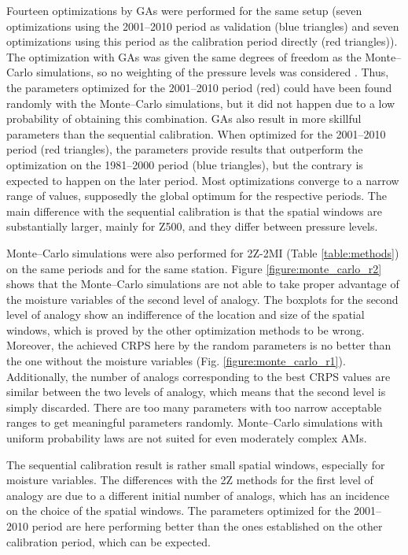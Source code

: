 \documentclass[review]{elsarticle}
\begin{document}
Fourteen optimizations by GAs were performed for the same setup (seven optimizations using the 2001--2010 period as validation (blue triangles) and seven optimizations using this period as the calibration period directly (red triangles)). The optimization with GAs was given the same degrees of freedom as the Monte--Carlo simulations, so no weighting of the pressure levels was considered \citep[as in][]{Horton2018a}. Thus, the parameters optimized for the 2001--2010 period (red) could have been found randomly with the Monte--Carlo simulations, but it did not happen due to a low probability of obtaining this combination. GAs also result in more skillful parameters than the sequential calibration. When optimized for the 2001--2010 period (red triangles), the parameters provide results that outperform the optimization on the 1981--2000 period (blue triangles), but the contrary is expected to happen on the later period. Most optimizations converge to a narrow range of values, supposedly the global optimum for the respective periods. The main difference with the sequential calibration is that the spatial windows are substantially larger, mainly for Z500, and they differ between pressure levels.  

Monte--Carlo simulations were also performed for 2Z-2MI (Table \ref{table:methods}) on the same periods and for the same station. Figure \ref{figure:monte_carlo_r2} shows that the Monte--Carlo simulations are not able to take proper advantage of the moisture variables of the second level of analogy. The boxplots for the second level of analogy show an indifference of the location and size of the spatial windows, which is proved by the other optimization methods to be wrong. Moreover, the achieved CRPS here by the random parameters is no better than the one without the moisture variables (Fig. \ref{figure:monte_carlo_r1}). Additionally, the number of analogs corresponding to the best CRPS values are similar between the two levels of analogy, which means that the second level is simply discarded. There are too many parameters with too narrow acceptable ranges to get meaningful parameters randomly. Monte--Carlo simulations with uniform probability laws are not suited for even moderately complex AMs. 

The sequential calibration result is rather small spatial windows, especially for moisture variables. The differences with the 2Z methods for the first level of analogy are due to a different initial number of analogs, which has an incidence on the choice of the spatial windows. The parameters optimized for the 2001--2010 period are here performing better than the ones established on the other calibration period, which can be expected.
\end{document}
